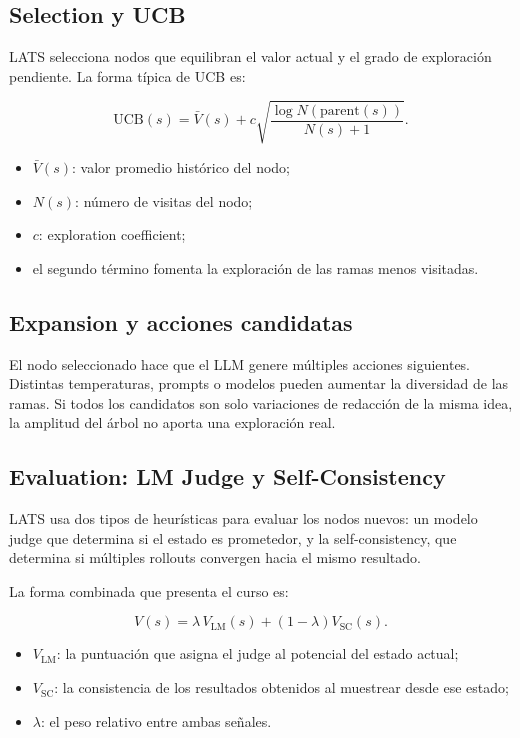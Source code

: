 \documentclass[a4paper]{article}
\begin{document}
\subsection{Selection y UCB}

LATS selecciona nodos que equilibran el valor actual y el grado de exploración pendiente. La forma típica de UCB es:

$$
\mathrm{UCB}(s)=\bar V(s)+c\sqrt{\frac{\log N(\mathrm{parent}(s))}{N(s)+1}}.
$$

\begin{itemize}
    \item $\bar V(s)$: valor promedio histórico del nodo;
    \item $N(s)$: número de visitas del nodo;
    \item $c$: exploration coefficient;
    \item el segundo término fomenta la exploración de las ramas menos visitadas.
\end{itemize}

\subsection{Expansion y acciones candidatas}

El nodo seleccionado hace que el LLM genere múltiples acciones siguientes. Distintas temperaturas, prompts o modelos pueden aumentar la diversidad de las ramas. Si todos los candidatos son solo variaciones de redacción de la misma idea, la amplitud del árbol no aporta una exploración real.

\subsection{Evaluation: LM Judge y Self-Consistency}

LATS usa dos tipos de heurísticas para evaluar los nodos nuevos: un modelo judge que determina si el estado es prometedor, y la self-consistency, que determina si múltiples rollouts convergen hacia el mismo resultado.


La forma combinada que presenta el curso es:

$$
V(s)=\lambda\,V_{\mathrm{LM}}(s)+(1-\lambda)V_{\mathrm{SC}}(s).
$$

\begin{itemize}
    \item $V_{\mathrm{LM}}$: la puntuación que asigna el judge al potencial del estado actual;
    \item $V_{\mathrm{SC}}$: la consistencia de los resultados obtenidos al muestrear desde ese estado;
    \item $\lambda$: el peso relativo entre ambas señales.
\end{itemize}
\end{document}
